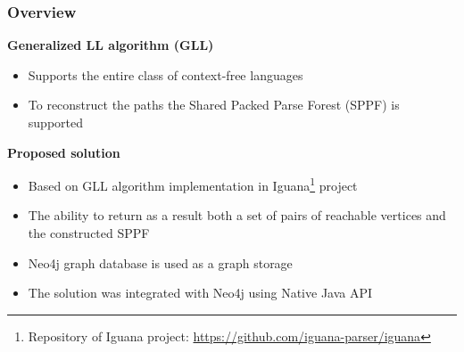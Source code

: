 \documentclass{beamer}
\begin{document}
\begin{frame}
  \transwipe[direction=90]
  \frametitle{Overview}
  \textbf{Generalized LL algorithm (GLL)}
\begin{itemize}
    \item Supports the entire class of context-free languages
    \item To reconstruct the paths the Shared Packed Parse Forest (SPPF) is supported
\end{itemize}
\textbf{Proposed solution}\\
  \begin{itemize}
    \item Based on GLL algorithm implementation in Iguana\footnote{ Repository of Iguana project: \url{https://github.com/iguana-parser/iguana}} project
    \item The ability to return as a result both a set of pairs of reachable vertices and the constructed SPPF 
    \item Neo4j graph database is used as a graph storage
    \item The solution was integrated with Neo4j using Native Java API
  \end{itemize}
  \end{frame}
  
\end{document}
